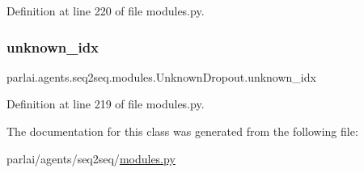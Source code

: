 Definition at line 220 of file modules.\+py.

\mbox{\label{classparlai_1_1agents_1_1seq2seq_1_1modules_1_1UnknownDropout_aff31c992c18277c85619d257401c621a}} 
\subsubsection{\texorpdfstring{unknown\+\_\+idx}{unknown\_idx}}
{\footnotesize\ttfamily parlai.\+agents.\+seq2seq.\+modules.\+Unknown\+Dropout.\+unknown\+\_\+idx}



Definition at line 219 of file modules.\+py.



The documentation for this class was generated from the following file\+:\begin{DoxyCompactItemize}
\item 
parlai/agents/seq2seq/\hyperlink{parlai_2agents_2seq2seq_2modules_8py}{modules.\+py}\end{DoxyCompactItemize}
